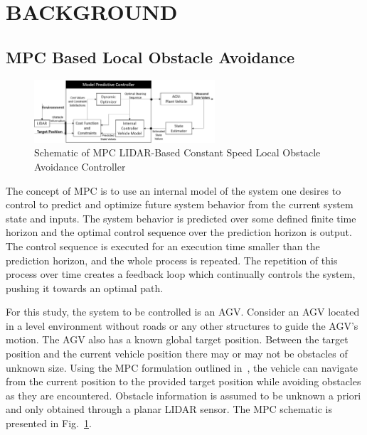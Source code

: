\documentclass[12pt,twocolumn]{article}
\begin{document}

\section{BACKGROUND}\label{s:background}

\subsection{MPC Based Local Obstacle Avoidance }\label{MPC}

\begin{figure}
	\centering
	\includegraphics[width=0.6\textwidth]{Figs/MPCBlockDiagram.png}
	\caption{{\small Schematic of MPC LIDAR-Based Constant Speed Local Obstacle Avoidance Controller}}    
	\label{fig:MPC_schematic}
\end{figure}

The concept of MPC is to use an internal model of the system one desires to control to predict and optimize future system behavior from the current system state and inputs. The system behavior is predicted over some defined finite time horizon and the optimal control sequence over the prediction horizon is output. The control sequence is executed for an execution time smaller than the prediction horizon, and the whole process is repeated. The repetition of this process over time creates a feedback loop which continually controls the system, pushing it towards an optimal path.

For this study, the system to be controlled is an AGV. Consider an AGV located in a level environment without roads or any other structures to guide the AGV’s motion. The AGV also has a known global target position. Between the target position and the current vehicle position there may or may not be obstacles of unknown size. Using the MPC formulation outlined in~\cite{ModelFidelity2016}, the vehicle can navigate from the current position to the provided target position while avoiding obstacles as they are encountered. Obstacle information is assumed to be unknown a priori and only obtained through a planar LIDAR sensor. The MPC schematic is presented in Fig.~\ref{fig:MPC_schematic}.
%
\end{document}
